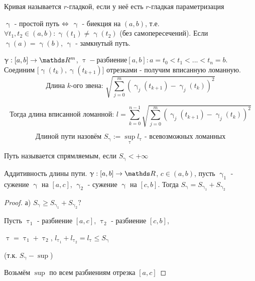 \documentclass[12pt, fleqn]{article}
\begin{document}
\begin{Property}[3]
\begin{Property}[4]
\begin{Property}[2, аддитивность]
\begin{Proof}
\begin{definition}
    Кривая называется $r$-гладкой, если у неё есть $r$-гладкая параметризация
\end{definition}

\begin{definition}
    $\upgamma$ - простой путь $\Leftrightarrow$ $\upgamma$ - биекция на $(a,b)$, т.е. $\forall t_1, t_2 \in (a,b): \upgamma(t_1) \neq \upgamma(t_2)$ (без самопересечений). Если $\upgamma(a) = \upgamma(b)$, $\upgamma$ - замкнутый путь.
\end{definition}

\begin{definition} 
    $\upgamma: [a,b] \rightarrow \R^m$, $\uptau - разбиение [a,b]: a=t_0<t_1<...<t_n=b$. Соединим $[\upgamma(t_k), \upgamma(t_{k+1})$] отрезками - получим вписанную ломанную. 
    $$\text{Длина $k$-ого звена: }\sqrt{\sum\limits_{j=0}^m (\upgamma_j(t_{k+1}) - \upgamma_j(t_k))^2}$$ 
    
    $$\text{Тогда длина вписанной ломанной: }l=\sum\limits_{k=0}^{n-1} \sqrt{\sum\limits_{j=0}^m (\upgamma_j(t_{k+1}) - \upgamma_j(t_k))^2}$$
    
    $$\text{Длиной пути назовём } S_\upgamma := \sup\limits_{\uptau} l_\uptau\text{ - всевозможных ломанных}$$
\end{definition}

\begin{definition}
    Путь называется спрямляемым, если $S_\upgamma < +\infty$
\end{definition}

\begin{utv}
    Аддитивность длины пути. $\upgamma: [a,b] \rightarrow \R$, $c \in (a,b)$, пусть $\upgamma_1$ - сужение $\upgamma$ на $[a,c]$, $\upgamma_2$ - сужение $\upgamma$ на $[c,b]$. Тогда $S_\upgamma = S_{\upgamma_1} + S_{\upgamma_2}$
\end{utv}

\begin{proof}
    а) $S_\upgamma \geqslant S_{\upgamma_1} + S_{\upgamma_2} ?$
    
    Пусть $\uptau_1$ - разбиение $[a,c]$, $\uptau_2$ - разбиение $[c,b]$, 
    
    $\uptau = \uptau_1 + \uptau_2$, $l_{\uptau_1} + l_{\uptau_2} = l_\uptau \leqslant S_\upgamma$ 
    
    (т.к. $S_\upgamma - \sup$)
    
    Возьмём $\sup$ по всем разбиениям отрезка $[a,c]$ 
    

\end{proof}
\end{Proof}
\end{Property}
\end{Property}
\end{Property}
\end{document}
